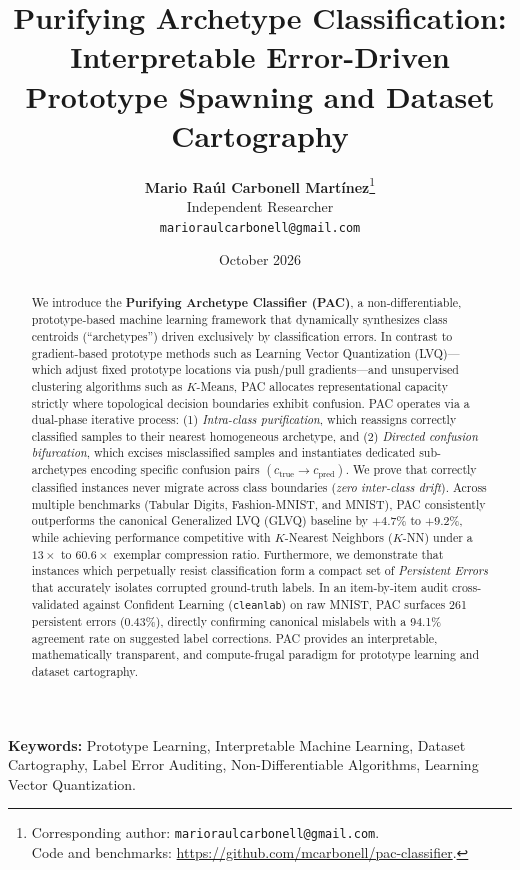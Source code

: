 \documentclass[11pt,a4paper]{article}
\title{\textbf{Purifying Archetype Classification: Interpretable Error-Driven Prototype Spawning and Dataset Cartography}}
\author{
  \textbf{Mario Raúl Carbonell Martínez}\thanks{Corresponding author: \texttt{marioraulcarbonell@gmail.com}.\\Code and benchmarks: \url{https://github.com/mcarbonell/pac-classifier}.} \\
  Independent Researcher \\
  \texttt{marioraulcarbonell@gmail.com}
}
\date{October 2026}
\begin{document}
\maketitle

\begin{abstract}
We introduce the \textbf{Purifying Archetype Classifier (PAC)}, a non-differentiable, prototype-based machine learning framework that dynamically synthesizes class centroids (``archetypes'') driven exclusively by classification errors. In contrast to gradient-based prototype methods such as Learning Vector Quantization (LVQ)---which adjust fixed prototype locations via push/pull gradients---and unsupervised clustering algorithms such as $K$-Means, PAC allocates representational capacity strictly where topological decision boundaries exhibit confusion. PAC operates via a dual-phase iterative process: (1) \textit{Intra-class purification}, which reassigns correctly classified samples to their nearest homogeneous archetype, and (2) \textit{Directed confusion bifurcation}, which excises misclassified samples and instantiates dedicated sub-archetypes encoding specific confusion pairs $(c_{\text{true}} \to c_{\text{pred}})$. We prove that correctly classified instances never migrate across class boundaries (\textit{zero inter-class drift}). Across multiple benchmarks (Tabular Digits, Fashion-MNIST, and MNIST), PAC consistently outperforms the canonical Generalized LVQ (GLVQ) baseline by $+4.7\%$ to $+9.2\%$, while achieving performance competitive with $K$-Nearest Neighbors ($K$-NN) under a $13\times$ to $60.6\times$ exemplar compression ratio. Furthermore, we demonstrate that instances which perpetually resist classification form a compact set of \textit{Persistent Errors} that accurately isolates corrupted ground-truth labels. In an item-by-item audit cross-validated against Confident Learning (\texttt{cleanlab}) on raw MNIST, PAC surfaces 261 persistent errors ($0.43\%$), directly confirming canonical mislabels with a 94.1\% agreement rate on suggested label corrections. PAC provides an interpretable, mathematically transparent, and compute-frugal paradigm for prototype learning and dataset cartography.
\end{abstract}

\vspace{0.5em}
\noindent\textbf{Keywords:} Prototype Learning, Interpretable Machine Learning, Dataset Cartography, Label Error Auditing, Non-Differentiable Algorithms, Learning Vector Quantization.

\newpage
\end{document}

